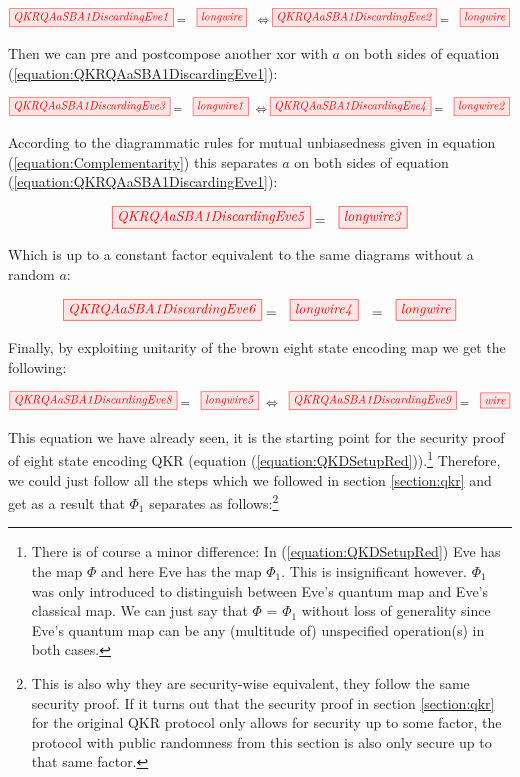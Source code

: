 \documentclass[]{article}
\begin{document}
\begin{equation}
\label{equation:QKRQAaSBA1DiscardingEve1}
\tikzfig{QKRQAaSBA1DiscardingEve1} = ~~ \tikzfig{longwire}
~~\Leftrightarrow
\tikzfig{QKRQAaSBA1DiscardingEve2} = ~~ \tikzfig{longwire}
\end{equation}

Then we can pre and postcompose another xor with $a$ on both sides of equation (\ref{equation:QKRQAaSBA1DiscardingEve1}):

\begin{equation}\\
\label{equation:QKRQAaSBA1DiscardingEve3}
\tikzfig{QKRQAaSBA1DiscardingEve3} = ~~ \tikzfig{longwire1} ~
\Leftrightarrow
\tikzfig{QKRQAaSBA1DiscardingEve4} = ~~ \tikzfig{longwire2}
\end{equation}

According to the diagrammatic rules for mutual unbiasedness given in equation (\ref{equation:Complementarity}) this separates $a$ on both sides of equation (\ref{equation:QKRQAaSBA1DiscardingEve1}):

\begin{equation}
\label{QKRQAaSBA1DiscardingEve5}
\tikzfig{QKRQAaSBA1DiscardingEve5} = ~~ \tikzfig{longwire3}
\end{equation}

Which is up to a constant factor equivalent to the same diagrams without a random $a$:

\begin{equation}
\tikzfig{QKRQAaSBA1DiscardingEve6} = ~~ \tikzfig{longwire4} ~~ = ~~ \tikzfig{longwire}
\end{equation}

Finally, by exploiting unitarity of the brown eight state encoding map we get the following:

\begin{equation}
\tikzfig{QKRQAaSBA1DiscardingEve8} = ~~ \tikzfig{longwire5} ~ \Leftrightarrow ~~ \tikzfig{QKRQAaSBA1DiscardingEve9} = ~~ \tikzfig{wire}
\end{equation}


This equation we have already seen, it is the starting point for the security proof of eight state encoding QKR (equation (\ref{equation:QKDSetupRed})).\footnote{There is of course a minor difference: In (\ref{equation:QKDSetupRed}) Eve has the map $\Phi$ and here Eve has the map $\Phi_1$. This is insignificant however. $\Phi_1$ was only introduced to distinguish between Eve's quantum map and Eve's classical map. We can just say that $\Phi$ = $\Phi_1$ without loss of generality since Eve's quantum map can be any (multitude of) unspecified operation(s) in both cases.} Therefore, we could just follow all the steps which we followed in section \ref{section:qkr} and get as a result that $\Phi_1$ separates as follows:\footnote{This is also why they are security-wise equivalent, they follow the same security proof. If it turns out that the security proof in section \ref{section:qkr} for the original QKR protocol only allows for security up to some factor, the protocol with public randomness from this section is also only secure up to that same factor.}
\end{document}
